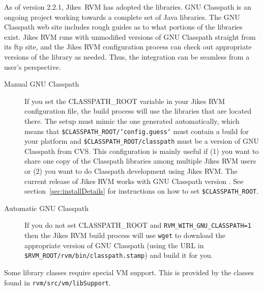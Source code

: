  As of version 2.2.1, Jikes\TMweb\ RVM has adopted the
 libraries.  GNU
Classpath is an ongoing project working towards a complete set of
Java\TMweb{} libraries.  The GNU Classpath web site includes
rough guides as to what portions of the libraries exist.  Jikes RVM
runs with unmodified versions of GNU Classpath straight from its ftp
site, and the Jikes RVM configuration process can check out
appropriate versions of the library as needed.  Thus, the integration
can be seamless from a user's perspective.

\begin{description}
\item[Manual GNU Classpath] If you set the CLASSPATH\_ROOT variable in
your Jikes RVM configuration file, the build process will use the
libraries that are located there.  The setup must mimic the one
generated automatically, which means that
{\tt \$CLASSPATH\_ROOT/`config.guess`} must contain a build for your platform
and {\tt \$CLASSPATH\_ROOT/classpath} must be a version of GNU Classpath from
CVS.  This configuration is mainly useful if (1) you want to share one
copy of the Classpath libraries among multiple Jikes RVM users or (2)
you want to do Classpath development using Jikes RVM. The
current release of Jikes RVM works with GNU Classpath version
\classpathversion. See section~\ref{sec:installDetails} for instructions
on how to set {\tt \$CLASSPATH\_ROOT}.

\item[Automatic GNU Classpath] If you do not set CLASSPATH\_ROOT and 
{\tt RVM\_WITH\_GNU\_CLASSPATH=1} then the Jikes RVM build process
will use {\tt wget} to download the appropriate version of GNU Classpath (using
the URL in {\tt \$RVM\_ROOT/rvm/bin/classpath.stamp}) and build it for
you. 
\end{description}

Some library classes require special VM support.  This is provided by
the classes found in {\tt rvm/src/vm/libSupport}. 

